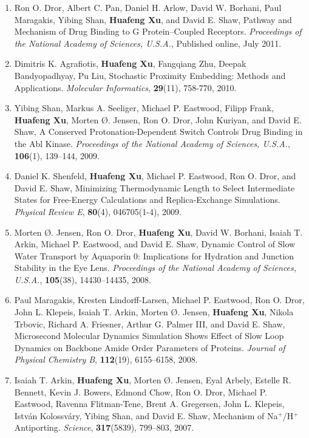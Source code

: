 \documentclass[11pt]{article}
\begin{document}
\begin{enumerate}
\item
Ron O. Dror, Albert C. Pan, Daniel H. Arlow, David W. Borhani, Paul Maragakis, Yibing Shan, \textbf{Huafeng Xu}, and David E. Shaw, Pathway and Mechanism of Drug Binding to G Protein–Coupled Receptors. \textit{Proceedings of the National Academy of Sciences, U.S.A.}, Published online, July 2011.
\item
Dimitris K. Agrafiotis, \textbf{Huafeng Xu}, Fangqiang Zhu, Deepak Bandyopadhyay, Pu Liu, Stochastic Proximity Embedding: Methods and Applications. \textit{Molecular Informatics}, \textbf{29}(11), 758-770, 2010.
\item
Yibing Shan, Markus A. Seeliger, Michael P. Eastwood, Filipp Frank, \textbf{Huafeng Xu}, Morten \O. Jensen, Ron O. Dror, John Kuriyan, and David E. Shaw, A Conserved Protonation-Dependent Switch Controls Drug Binding in the Abl Kinase. \textit{Proceedings of the National Academy of Sciences, U.S.A.}, \textbf{106}(1), 139–144, 2009.
\item
Daniel K. Shenfeld, \textbf{Huafeng Xu}, Michael P. Eastwood, Ron O. Dror, and David E. Shaw, Minimizing Thermodynamic Length to Select Intermediate States for Free-Energy Calculations and Replica-Exchange Simulations. \textit{Physical Review E}, \textbf{80}(4), 046705(1-4), 2009.
\item
Morten \O. Jensen, Ron O. Dror, \textbf{Huafeng Xu}, David W. Borhani, Isaiah T. Arkin, Michael P. Eastwood, and David E. Shaw, Dynamic Control of Slow Water Transport by Aquaporin 0: Implications for Hydration and Junction Stability in the Eye Lens. \textit{Proceedings of the National Academy of Sciences, U.S.A.}, \textbf{105}(38), 14430–14435, 2008.
\item
Paul Maragakis, Kresten Lindorff-Larsen, Michael P. Eastwood, Ron O. Dror, John L. Klepeis, Isaiah T. Arkin, Morten \O. Jensen, \textbf{Huafeng Xu}, Nikola Trbovic, Richard A. Friesner, Arthur G. Palmer III, and David E. Shaw, Microsecond Molecular Dynamics Simulation Shows Effect of Slow Loop Dynamics on Backbone Amide Order Parameters of Proteins. \textit{Journal of Physical Chemistry B}, \textbf{112}(19), 6155–6158, 2008.
\item
Isaiah T. Arkin, \textbf{Huafeng Xu}, Morten \O. Jensen, Eyal Arbely, Estelle R. Bennett, Kevin J. Bowers, Edmond Chow, Ron O. Dror, Michael P. Eastwood, Ravenna Flitman-Tene, Brent A. Gregersen, John L. Klepeis, István Kolossváry, Yibing Shan, and David E. Shaw, Mechanism of Na$^+$/H$^+$ Antiporting. \textit{Science}, \textbf{317}(5839), 799–803, 2007.

\end{enumerate}
\end{document}
